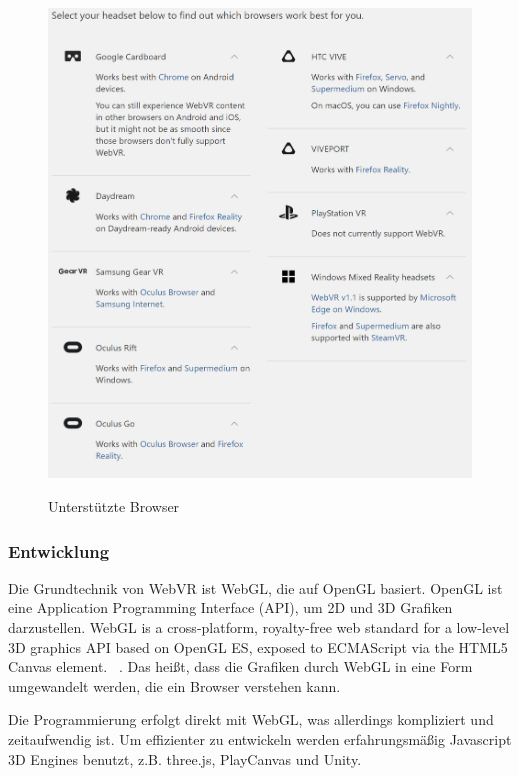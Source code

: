 \begin{figure}[ht]
\vspace*{1em}
\centering
\caption{Unterstützte Browser}
\includegraphics[width=\textwidth]{images/supportedBrowsers.png}
\label{fig:supportedBrowsers} 
\end{figure}
 
  \subsubsection{Entwicklung}
 Die Grundtechnik von WebVR ist WebGL, die auf OpenGL basiert. OpenGL ist eine Application Programming Interface (API), um 2D und 3D Grafiken darzustellen. \glqq WebGL is a cross-platform, royalty-free web standard for a low-level 3D graphics API based on OpenGL ES, exposed to ECMAScript via the HTML5 Canvas element. \grqq\ \citep{23}. Das heißt, dass die Grafiken durch WebGL in eine Form umgewandelt werden, die ein Browser verstehen kann. 
 
 Die Programmierung erfolgt direkt mit WebGL, was allerdings kompliziert und zeitaufwendig ist. Um effizienter zu entwickeln werden erfahrungsmäßig Javascript 3D Engines benutzt, z.B. three.js, PlayCanvas und Unity.
 
